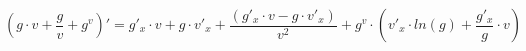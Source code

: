 \documentclass[a4paper,12pt]{article}
\begin{document}
$$(g \cdot v +  \frac{g}{v}  + g ^{v} )' = g'_{x}  \cdot v + g \cdot v'_{x}  +  \frac{(g'_{x}  \cdot v - g \cdot v'_{x} )}{v ^{2} }  + g ^{v}  \cdot (v'_{x}  \cdot  ln (g)  +  \frac{g'_{x} }{g}  \cdot v)$$
\end{document}
